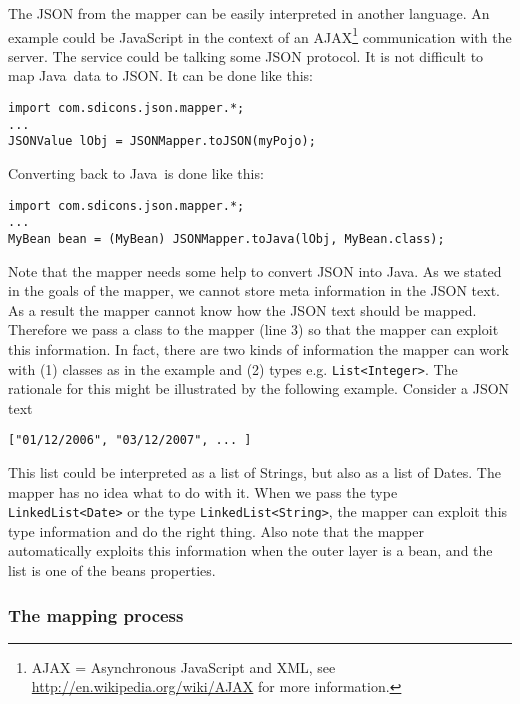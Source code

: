 \documentclass[a4paper]{article}
\newcommand{\java}{Java}
\begin{document}
The JSON from the mapper can be easily interpreted in another language. An example could be JavaScript in the context of an AJAX\footnote{AJAX = Asynchronous JavaScript and XML, see \url{http://en.wikipedia.org/wiki/AJAX} for more information.} communication with the server. The service could be talking some JSON protocol. It is not difficult to map \java\ data to JSON. It can be done like this:

\medskip
\begin{lstlisting}
import com.sdicons.json.mapper.*;
...
JSONValue lObj = JSONMapper.toJSON(myPojo);
\end{lstlisting}
\medskip

Converting back to \java\ is done like this:

\medskip
\begin{lstlisting}
import com.sdicons.json.mapper.*;
...
MyBean bean = (MyBean) JSONMapper.toJava(lObj, MyBean.class);
\end{lstlisting}
\medskip

Note that the mapper needs some help to convert JSON into \java. As we stated in the goals of the mapper, we cannot store meta information in the JSON text. As a result the mapper cannot know how the JSON text should be mapped. Therefore we pass a class to the mapper (line 3) so that the mapper can exploit this information. In fact, there are two kinds of information the mapper can work with (1) classes as in the example and (2) types e.g. \lstinline{List<Integer>}. The rationale for this might be illustrated by the following example. Consider a JSON text 

\medskip
\begin{lstlisting}
["01/12/2006", "03/12/2007", ... ]
\end{lstlisting}
\medskip

This list could be interpreted as a list of Strings, but also as a list of Dates. The mapper has no idea what to do with it. When we pass the type \lstinline{LinkedList<Date>} or the type \lstinline{LinkedList<String>}, the mapper can exploit this type information and do the right thing. Also note that the mapper automatically exploits this information when the outer layer is a bean, and the list is one of the beans properties.

\subsubsection{The mapping process}
\label{mappingprocess}
\end{document}
